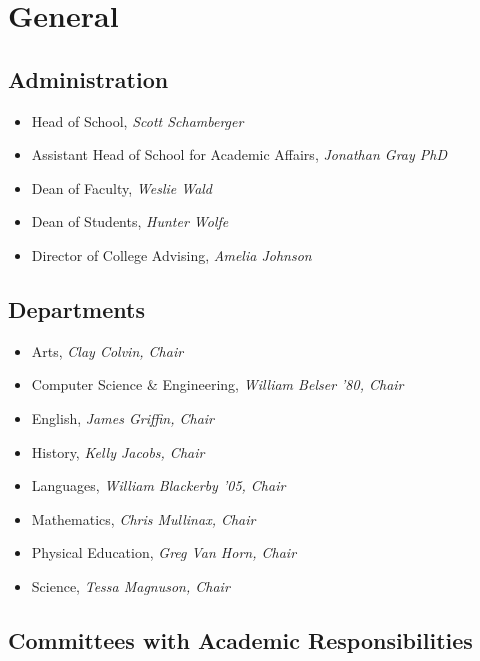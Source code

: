 \chapter{General}
\section{Administration}

\begin{itemize}\itemsep=0mm
  \item[] Head of School, \emph{Scott Schamberger}
  \item[] Assistant Head of School for Academic Affairs, \emph{Jonathan Gray PhD}
  \item[] Dean of Faculty, \emph{Weslie Wald}
  \item[] Dean of Students, \emph{Hunter Wolfe}
  \item[] Director of College Advising, \emph{Amelia Johnson}
\end{itemize}

\section{Departments}

\begin{itemize}\itemsep=0mm
  \item[] Arts, \emph{Clay Colvin, Chair}
  \item[] Computer Science \& Engineering, \emph{William Belser '80, Chair}
  \item[] English, \emph{James Griffin, Chair}
  \item[] History, \emph{Kelly Jacobs, Chair}
  \item[] Languages, \emph{William Blackerby  '05, Chair}
  \item[] Mathematics, \emph{Chris Mullinax, Chair}
  \item[] Physical Education, \emph{Greg Van Horn, Chair}
  \item[] Science, \emph{Tessa Magnuson, Chair               }
\end{itemize}

\section{Committees with Academic Responsibilities}

